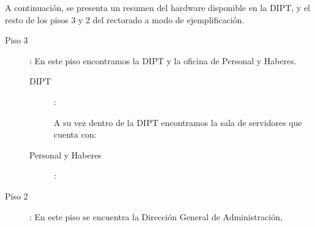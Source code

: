 \documentclass[a4paper,11pt,oneside]{article}
\begin{document}
A continuación, se presenta un resumen del hardware disponible en la
DIPT, y el resto de los pisos 3 y 2 del rectorado a modo de ejemplificación.
%
\begin{description}
  \item[Piso 3]: En este piso encontramos la DIPT y la oficina de Personal y Haberes.
    \begin{description}
      \item[DIPT]:
      A su vez dentro de la DIPT encontramos la sala de servidores que cuenta con:
      \item[Personal y Haberes]:
    \end{description}
  \item[Piso 2]: En este piso se encuentra la Dirección General de Administración,

\end{description}
\end{document}

